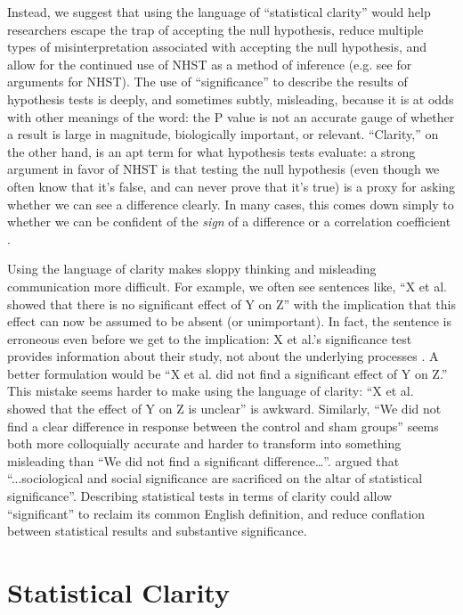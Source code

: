 Instead, we suggest that using the language of ``statistical clarity'' would help researchers escape the trap of accepting 
the null hypothesis, reduce multiple types of misinterpretation associated with accepting the null hypothesis, and allow for
the continued use of NHST as a method of inference (e.g.
see \citealt{Abelson1997} for arguments for NHST).
The use of ``significance'' to describe the results of hypothesis tests is deeply, and sometimes subtly, misleading, because it is at odds with other meanings of the word: the P value is not an accurate gauge of whether a result is large in magnitude, biologically important, or relevant.
``Clarity,'' on the other hand, is an apt term for what hypothesis tests evaluate: a strong argument in favor of NHST is that testing the null hypothesis (even though we often know that it's false, and can never prove that it's true) is a proxy for asking whether we can see a difference clearly. In many cases, this comes down simply to whether we can be confident of the \emph{sign} of a difference or a correlation coefficient \cite{robinson2001past}.

Using the language of clarity makes sloppy thinking and misleading communication more difficult. 
For example, we often see sentences like, ``X et al. showed that there is no significant effect of Y on Z'' with the implication that this effect can now be assumed to be absent (or unimportant).
In fact, the sentence is erroneous even before we get to the implication: X et al.'s significance test provides information about their study, not about the underlying processes \cite{CanWeCiteThis}.
A better formulation would be ``X et al. did not find a significant effect of Y on Z.''
This mistake seems harder to make using the language of clarity:  ``X et al. showed that the effect of Y on Z is unclear'' is awkward.
Similarly, ``We did not find a clear difference in response between the control and sham groups'' seems both more colloquially accurate and harder to transform into something misleading than ``We did not find a significant difference\ldots''.
\citet{Bernardietal.2017} argued that ``...sociological and social significance are sacrificed on the altar of statistical significance''.
Describing statistical tests in terms of clarity could allow ``significant'' to reclaim its common English definition, and reduce conflation between statistical results and substantive significance.

\section*{Statistical Clarity}

